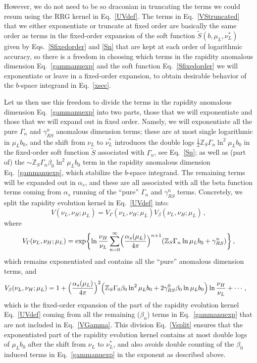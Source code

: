 \documentclass[a4,letterpaper,11pt]{article}
\newcommand{\be}{\begin{equation}}
\newcommand{\ee}{\end{equation}}
\newcommand{\as}{\alpha_s}
\newcommand{\zed}{\mathbb{Z}}
\newcommand{\wt}{\widetilde}
\newcommand{\eq}[1]{Eq.~\eqref{#1}}
\newcommand{\eqs}[2]{Eqs.~\eqref{#1} and \eqref{#2}}
\begin{document}
However, we do not need to be so draconian in truncating the terms we could resum using the RRG kernel in \eq{UVdef}. The terms in \eq{VStruncated} that we either exponentiate or truncate at fixed order are basically the same order as terms in the fixed-order expansion of the soft function $\wt S(b,\mu_L,\nu_L^*)$ given by \eqs{Sfixedorder}{Sn} that are kept at each order of logarithmic accuracy, so there is a freedom in choosing which terms in the rapidity anomalous dimension \eq{gammanuexp} and the soft function \eq{Sfixedorder} we will exponentiate or leave in a fixed-order expansion, to obtain desirable behavior of the $b$-space integrand in \eq{xsec}.

Let us then use this freedom to divide the terms in the rapidity anomalous dimension \eq{gammanuexp} into two parts, those that we will exponentiate and those that we will expand out in fixed order. Namely, we will exponentiate all the pure $\Gamma_n$ and $\gamma_{RS}^n$ anomalous dimension terms; these are at most single logarithmic in $\mu_L b_0$, and the shift from $\nu_L$ to $\nu_L^*$ introduces the double logs  $\frac{1}{2}\zed_S\Gamma_n \ln^2\mu_L b_0$ in the fixed-order soft function $\wt S$ associated with $\Gamma_n$, see \eq{Sn}; as well as (part of) the $\sim \zed_S\Gamma_n \beta_0\ln^2\mu_L b_0$ term in the rapidity anomalous dimension \eq{gammanuexp}, which stabilize the $b$-space integrand. The remaining terms will be expanded out in $\as$, and these are all associated with all the beta function terms coming from $\as$ running of the ``pure'' $\Gamma_n$ and $\gamma_{RS}^n$ terms. Concretely, we split the rapidity evolution kernel in \eq{UVdef} into:
\be
\label{Vsplit}
V(\nu_L,\nu_H;\mu_L) = V_\Gamma(\nu_L,\nu_H;\mu_L) V_\beta(\nu_L,\nu_H;\mu_L)\,,
\ee
where
\be
\label{VGamma}
V_\Gamma (\nu_L,\nu_H;\mu_L) = \exp\biggl\{ \ln\frac{\nu_H}{\nu_L} \sum_{n=0}^\infty \Bigl(\frac{\as(\mu_L)}{4\pi}\Bigr)^{n+1}(\zed_S \Gamma_n \ln\mu_L b_0 + \gamma_{RS}^n)\biggr\}\,,
\ee
which remains exponentiated and contains all the ``pure'' anomalous dimension terms, and
\begin{align}
\label{Vbeta}
V_\beta (\nu_L,\nu_H;\mu_L) &= 1 + \Bigl(\frac{\as(\mu_L)}{4\pi}\Bigr)^2 \Bigl( \zed_S \Gamma_0\beta_0 \ln^2\mu_L b_0 + 2\gamma_{RS}^0\beta_0 \ln \mu_L b_0\Bigr) \ln\frac{\nu_H}{\nu_L} + \cdots\,,
\end{align}
which is the fixed-order expansion of the part of the rapidity evolution kernel \eq{UVdef} coming from all the remaining ($\beta_n$) terms in \eq{gammanuexp} that are not included in \eq{VGamma}. This division \eq{Vsplit} ensures that the exponentiated part of the rapidity evolution kernel contains at most double logs of $\mu_L b_0$ after the shift from $\nu_L$ to $\nu_L^*$, and also avoids double counting of the $\beta_0$ induced terms in \eq{gammanuexp} in the exponent as described above.
\end{document}
